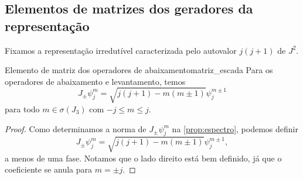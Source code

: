 \subsection{Elementos de matrizes dos geradores da representação}
Fixamos a representação irredutível caracterizada pelo autovalor \(j(j+1)\) de \(J^2\).
\begin{lemma}{Elemento de matriz dos operadores de abaixamento}{matriz_escada}
    Para os operadores de abaixamento e levantamento, temos
    \begin{equation*}
        J_\pm \psi_j^m = \sqrt{j(j+1) - m(m\pm 1)} \psi_j^{m\pm 1}
    \end{equation*}
    para todo \(m\in \sigma(J_3)\) com \(-j \leq m \leq j\).
\end{lemma}
\begin{proof}
    Como determinamos a norma de \(J_\pm\psi_{j}^{m}\) na \cref{prop:espectro}, podemos definir
    \begin{equation*}
        J_\pm\psi_{j}^{m} = \sqrt{j(j+1) - m(m\pm1)} \psi_{j}^{m\pm1},
    \end{equation*}
    a menos de uma fase. Notamos que o lado direito está bem definido, já que o coeficiente se anula para \(m = \pm j\).
\end{proof}

